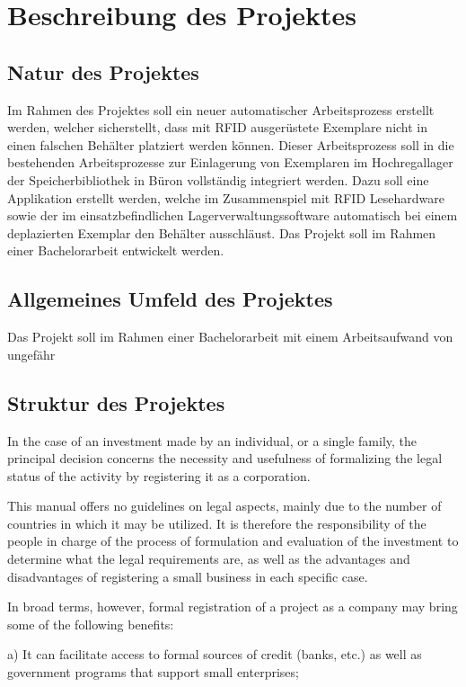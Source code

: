 \chapter{Beschreibung des Projektes}

\section{Natur des Projektes}
Im Rahmen des Projektes soll ein neuer automatischer Arbeitsprozess erstellt werden, welcher sicherstellt, dass mit RFID ausgerüstete Exemplare nicht in einen falschen Behälter platziert werden können. Dieser Arbeitsprozess soll in die bestehenden Arbeitsprozesse zur Einlagerung von Exemplaren im Hochregallager der Speicherbibliothek in Büron vollständig integriert werden. Dazu soll eine Applikation erstellt werden, welche im Zusammenspiel mit RFID Lesehardware sowie der im einsatzbefindlichen Lagerverwaltungssoftware automatisch bei einem deplazierten Exemplar den Behälter ausschläust. Das Projekt soll im Rahmen einer Bachelorarbeit entwickelt werden.

\section{Allgemeines Umfeld des Projektes}
Das Projekt soll im Rahmen einer Bachelorarbeit mit einem Arbeitsaufwand von ungefähr 

\section{Struktur des Projektes}

In the case of an investment made by an individual, or a single family, the principal decision concerns the necessity and usefulness of formalizing the legal status of the activity by registering it as a corporation.

This manual offers no guidelines on legal aspects, mainly due to the number of countries in which it may be utilized. It is therefore the responsibility of the people in charge of the process of formulation and evaluation of the investment to determine what the legal requirements are, as well as the advantages and disadvantages of registering a small business in each specific case.

In broad terms, however, formal registration of a project as a company may bring some of the following benefits:

a) It can facilitate access to formal sources of credit (banks, etc.) as well as government programs that support small enterprises;

